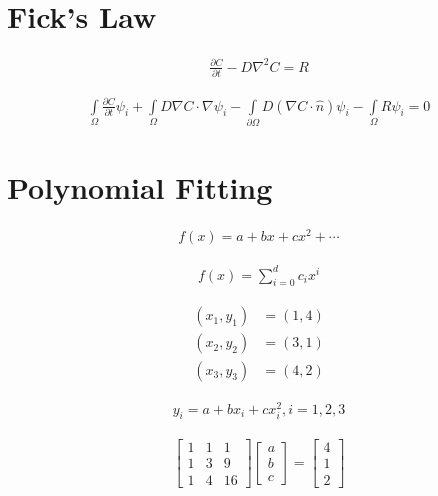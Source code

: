 \documentclass{article}
\begin{document}
	
	\section*{Fick's Law}
	
	\begin{align*}
		\frac{\partial C}{\partial t} - D \nabla^2 C = R
	\end{align*}
	
	\begin{align*}
		\int\limits_{\Omega} \frac{\partial C}{\partial t} \psi_i + \int\limits_{\Omega} D \nabla C \cdot \nabla \psi_i - \int\limits_{\partial \Omega} D (\nabla C \cdot \hat{n}) \psi_i - \int\limits_{\Omega} R \psi_i = 0
	\end{align*}
	
	\section*{Polynomial Fitting}
	
	\begin{align*}
		f(x) = a + bx + cx^2 + \cdots
	\end{align*}
	
	\begin{align*}
		f(x) = \sum_{i=0}^{d} c_i x^i
	\end{align*}
	
	\begin{align*}
		(x_1, y_1) &= (1, 4) \\
		(x_2, y_2) &= (3, 1) \\
		(x_3, y_3) &= (4, 2)
	\end{align*}
	
	\begin{align*}
		y_i = a + bx_i + c x_i^2, i = 1, 2, 3 
	\end{align*}
	
	\begin{align*}
		\begin{bmatrix}
			1 & 1 & 1 \\
			1  & 3 & 9 \\
			1 & 4 & 16
		\end{bmatrix} \! \! \!
		\begin{bmatrix}
			a \\ b \\ c
		\end{bmatrix}
		=
		\begin{bmatrix}
		4 \\ 1 \\ 2
		\end{bmatrix}
	\end{align*}
	
\end{document}
